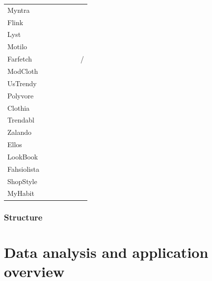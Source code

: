 \documentclass{beamer}
\newcommand{\cmark}{\color{ForestGreen}\ding{52}} %
\newcommand{\xmark}{\color{RedOrange}\ding{55}}   %
\begin{document}
\begin{frame}
\begin{table}[H]
{\begin{tabular}{lllllll}
                Myntra  & \cmark & \cmark & \cmark & \cmark & \xmark & \xmark \\
                Flink   & \xmark & \cmark & \cmark & \cmark & \cmark & \xmark \\
                Lyst    & \xmark & \cmark & \cmark & \cmark & \cmark & \xmark \\
                Motilo  & \xmark & \cmark & \xmark & \cmark & \cmark & \xmark \\
                Farfetch & \cmark & \cmark & \cmark & \cmark & \xmark & \xmark/\cmark \\
                ModCloth  & \cmark & \cmark & \cmark & \cmark & \xmark & \xmark \\
                UsTrendy  & \cmark & \cmark & \cmark & \cmark & \xmark & \xmark \\
                Polyvore  & \xmark & \cmark & \cmark & \cmark & \cmark & \xmark \\
                Clothia  & \xmark & \cmark & \cmark & \cmark & \cmark & \xmark \\
                Trendabl  & \cmark & \cmark & \cmark & \cmark & \cmark & \xmark \\
                Zalando  & \cmark & \cmark & \cmark & \cmark & \xmark & \xmark \\
                Ellos  & \cmark & \cmark & \cmark & \cmark & \xmark & \xmark \\
                LookBook  & \xmark & \cmark & \cmark & \cmark & \cmark & \xmark \\
                Fahsiolista  & \xmark & \cmark & \xmark & \cmark & \cmark & \xmark \\
                ShopStyle  & \xmark & \xmark & \cmark & \cmark & \xmark & \xmark \\
                MyHabit  & \cmark & \xmark & \cmark & \xmark & \xmark & \xmark \\
                \bottomrule
            \end{tabular}
          }
      \end{table}
  \end{frame}

  \begin{frame}
    \frametitle{Structure}
    \tableofcontents
  \end{frame}

  \section{Data analysis and application overview}
\end{document}
